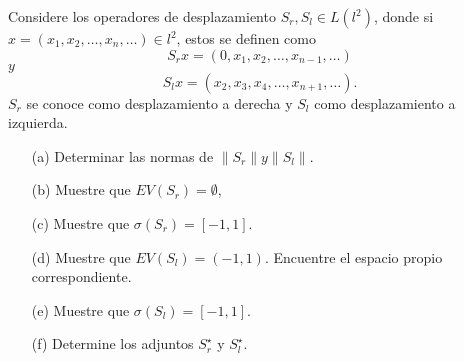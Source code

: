 
Considere los operadores de desplazamiento $S_r, S_l \in L\left(l^2\right)$, donde si $x=\left(x_1, x_2, \ldots, x_n, \ldots\right) \in l^2$, estos se definen como
$$
S_r x=\left(0, x_1, x_2, \ldots, x_{n-1}, \ldots\right)
$$
$y$
$$
S_l x=\left(x_2, x_3, x_4, \ldots, x_{n+1}, \ldots\right) .
$$
$S_r$ se conoce como desplazamiento a derecha y $S_l$ como desplazamiento a izquierda.
\begin{itemize}
    \item[(a)] Determinar las normas de $\left\|S_r\right\| y\left\|S_l\right\|$.
\item[(b)] Muestre que $E V\left(S_r\right)=\emptyset$,
\item[(c)] Muestre que $\sigma\left(S_r\right)=[-1,1]$.
\item[(d)] Muestre que $E V\left(S_l\right)=(-1,1)$. Encuentre el espacio propio correspondiente.
\item[(e)] Muestre que $\sigma\left(S_l\right)=[-1,1]$.
\item[(f)] Determine los adjuntos $S_r^{\star}$ y $S_l^{\star}$. 
\end{itemize}





